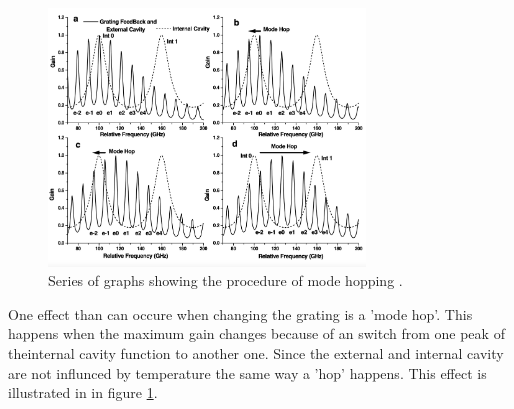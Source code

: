 \noindent

\begin{figure}
    \centering
    \includegraphics[width=0.75\textwidth]{modehops.png}
    \caption{Series of graphs showing the procedure of mode hopping \cite{V60}.}
    \label{fig:modehops}
  \end{figure}


\noindent
One effect than can occure when changing the grating is a 'mode hop'. This happens when the maximum gain changes because of an switch 
from one peak of theinternal cavity function to another one. Since the external and internal cavity are not influnced 
by temperature the same way a 'hop' happens. This effect is illustrated in in figure \ref{fig:modehops}.




